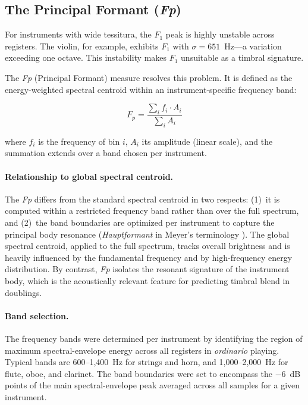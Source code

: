 \documentclass[12pt,a4paper]{article}
\begin{document}
\subsection{The Principal Formant (\textit{Fp})}
\label{sec:fp}

For instruments with wide tessitura, the $F_1$ peak is highly unstable across
registers. The violin, for example, exhibits $F_1$ with $\sigma = 651$~Hz---a
variation exceeding one octave. This instability makes $F_1$ unsuitable as a
timbral signature.

The \textit{Fp} (Principal Formant) measure resolves this problem. It is defined
as the energy-weighted spectral centroid within an instrument-specific frequency
band:

\begin{equation}
F_p = \frac{\sum_{i} f_i \cdot A_i}{\sum_{i} A_i}
\label{eq:fp}
\end{equation}

\noindent where $f_i$ is the frequency of bin $i$, $A_i$ its amplitude (linear
scale), and the summation extends over a band chosen per instrument.

\paragraph{Relationship to global spectral centroid.}
The \textit{Fp} differs from the standard spectral centroid \citep{Peeters2011}
in two respects: (1)~it is computed within a restricted frequency band rather
than over the full spectrum, and (2)~the band boundaries are optimized per
instrument to capture the principal body resonance (\emph{Hauptformant} in
Meyer's terminology \citep{Meyer2009}). The global spectral centroid, applied to
the full spectrum, tracks overall brightness and is heavily influenced by the
fundamental frequency and by high-frequency energy distribution. By contrast,
\textit{Fp} isolates the resonant signature of the instrument body, which is the
acoustically relevant feature for predicting timbral blend in doublings.

\paragraph{Band selection.}
The frequency bands were determined per instrument by identifying the region of
maximum spectral-envelope energy across all registers in \emph{ordinario}
playing. Typical bands are 600--1,400~Hz for strings and horn, and
1,000--2,000~Hz for flute, oboe, and clarinet. The band boundaries were set to
encompass the $-6$~dB points of the main spectral-envelope peak averaged across
all samples for a given instrument.
\end{document}
